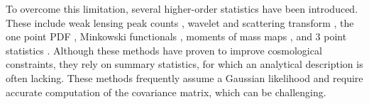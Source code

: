 \documentclass{aa}
\begin{document}
To overcome this limitation, several higher-order statistics have been introduced. These include weak lensing peak counts \citep{liu2015cosmology,  liu2015cosmological, lin2015new, kacprzak2016cosmology, peel2017cosmological, shan2018kids, martinet2018kids, ajani2020constraining, harnois2021cosmic, zurcher2022dark}, wavelet and scattering transform \citep{ajani2021starlet, cheng2021weak}, the one point PDF \citep{liu2019constraining, uhlemann2020fisher, boyle2021nuw}, Minkowski functionals \citep{kratochvil2012probing, petri2013cosmology}, moments of mass maps \citep{gatti2021dark},  and 3 point statistics \citep{takada2004cosmological, semboloni2011weak, rizzato2019tomographic, halder2021integrated}. 
Although these methods have proven to improve cosmological constraints, they rely on summary statistics, for which an analytical description is often lacking. These methods frequently assume a Gaussian likelihood and require accurate computation of the covariance matrix, which can be challenging.
\end{document}

